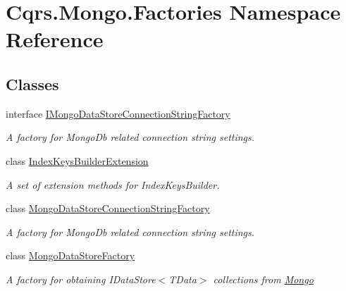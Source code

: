 \hypertarget{namespaceCqrs_1_1Mongo_1_1Factories}{}\section{Cqrs.\+Mongo.\+Factories Namespace Reference}
\label{namespaceCqrs_1_1Mongo_1_1Factories}
\subsection*{Classes}
\begin{DoxyCompactItemize}
\item 
interface \hyperlink{interfaceCqrs_1_1Mongo_1_1Factories_1_1IMongoDataStoreConnectionStringFactory}{I\+Mongo\+Data\+Store\+Connection\+String\+Factory}
\begin{DoxyCompactList}\small\item\em A factory for Mongo\+Db related connection string settings. \end{DoxyCompactList}\item 
class \hyperlink{classCqrs_1_1Mongo_1_1Factories_1_1IndexKeysBuilderExtension}{Index\+Keys\+Builder\+Extension}
\begin{DoxyCompactList}\small\item\em A set of extension methods for Index\+Keys\+Builder. \end{DoxyCompactList}\item 
class \hyperlink{classCqrs_1_1Mongo_1_1Factories_1_1MongoDataStoreConnectionStringFactory}{Mongo\+Data\+Store\+Connection\+String\+Factory}
\begin{DoxyCompactList}\small\item\em A factory for Mongo\+Db related connection string settings. \end{DoxyCompactList}\item 
class \hyperlink{classCqrs_1_1Mongo_1_1Factories_1_1MongoDataStoreFactory}{Mongo\+Data\+Store\+Factory}
\begin{DoxyCompactList}\small\item\em A factory for obtaining I\+Data\+Store$<$\+T\+Data$>$ collections from \hyperlink{namespaceCqrs_1_1Mongo}{Mongo} \end{DoxyCompactList}\end{DoxyCompactItemize}
